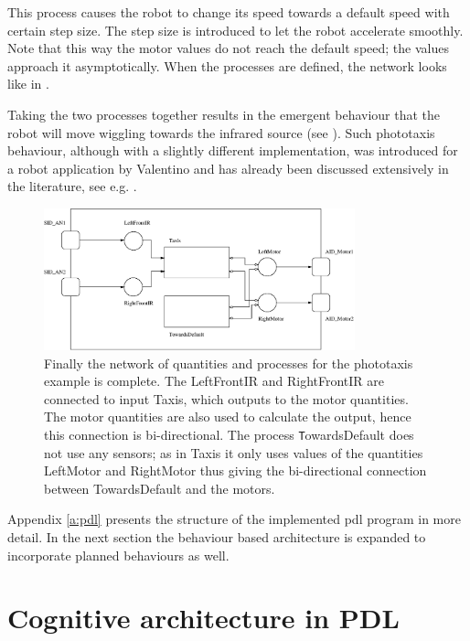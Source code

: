 This process causes the robot to change its speed towards a default speed with certain step size. The step size is introduced to let the robot accelerate smoothly. Note that this way the motor values do not reach the default speed; the values approach it asymptotically. When the processes are defined, the network looks like in .

Taking the two processes together results in the emergent behaviour that the robot will move wiggling towards the infrared source (see ). Such phototaxis behaviour, although with a slightly different implementation, was introduced for a robot application by Valentino \citet{braitenberg:1984} and has already been discussed extensively in the literature, see e.g. \citealt{steels:1994}.

\begin{figure}
\centerline{\includegraphics[width=9cm]{robots//pdl_network.eps}}
\caption{Finally the network of quantities and processes for the phototaxis example is complete. The {\ttfamily LeftFrontIR} and {\ttfamily RightFrontIR} are connected to input {\ttfamily Taxis}, which outputs to the motor quantities. The motor quantities are also used to calculate the output, hence this connection is bi-directional. The process {\texttt TowardsDefault} does not use any sensors; as in Taxis it only uses values of the quantities {\ttfamily LeftMotor} and {\ttfamily RightMotor} thus giving the bi-directional connection between {\ttfamily TowardsDefault} and the motors.}
\label{f:robots:pdl}
\end{figure}

Appendix \ref{a:pdl} presents the structure of the implemented {\sc pdl} program in more detail. In the next section the behaviour based architecture is expanded to incorporate planned behaviours as well.


\section{Cognitive architecture in PDL}\label{s:robots:architecture}
	
